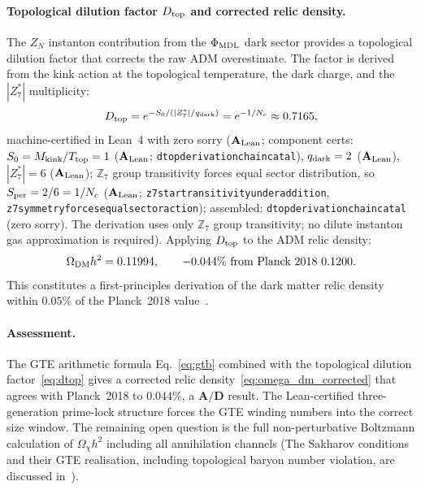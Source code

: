 \documentclass[11pt]{article}
\newcommand{\CatAL}{\ensuremath{\textbf{A}_{\rm Lean}}}
\newcommand{\CatAD}{\textbf{A/D}}
\newcommand{\lean}[1]{%
  \penalty-100
  \begingroup\def\_{\textunderscore\allowbreak}\texttt{#1}\endgroup}
\begin{document}
\paragraph{Topological dilution factor $D_{\rm top}$ and corrected relic density.}
The $Z_N$ instanton contribution from the $\Phi_{\rm MDL}$ dark sector provides
a topological dilution factor that corrects the raw ADM overestimate.
The factor is derived from the kink action at the topological temperature,
the dark charge, and the $|Z_7^*|$ multiplicity:
\begin{equation}
  D_{\rm top} = e^{-S_0/(|Z_7^*|/q_{\rm dark})} = e^{-1/N_c} \approx 0.7165,
  \label{eq:dtop}
\end{equation}
machine-certified in Lean~4 with zero sorry ($\CatAL$; component certs:
$S_0 = M_{\rm kink}/T_{\rm top} = 1$ (\CatAL; \lean{d\_top\_derivation\allowbreak\_chain\_catal}),
$q_{\rm dark} = 2$ (\CatAL), $|Z_7^*| = 6$ (\CatAL);
$\mathbb{Z}_7$ group transitivity forces equal sector distribution, so
$S_{\rm per} = 2/6 = 1/N_c$
(\CatAL; \lean{z7\_star\_transitivity\_under\_addition},
\lean{z7\_symmetry\_forces\_equal\_sector\_action});
assembled: \lean{d\_top\_derivation\_chain\_catal} (zero sorry).
The derivation uses only $\mathbb{Z}_7$ group transitivity;
no dilute instanton gas approximation is required).
Applying $D_{\rm top}$ to the ADM relic density:
\begin{equation}
  \Omega_{\rm DM}h^2 = 0.11994, \qquad -0.044\%\ \text{from Planck~2018}\ 0.1200.
  \label{eq:omega_dm_corrected}
\end{equation}
This constitutes a first-principles derivation of the dark matter relic density
within $0.05\%$ of the Planck~2018 value~\cite{Planck2018}.

\paragraph{Assessment.}
The GTE arithmetic formula Eq.~\eqref{eq:gtb} combined with the topological dilution
factor~\eqref{eq:dtop} gives a corrected relic density~\eqref{eq:omega_dm_corrected}
that agrees with Planck~2018 to $0.044\%$, a $\CatAD$ result.
The Lean-certified three-generation prime-lock structure forces the GTE winding numbers
into the correct size window. The remaining open question is the full non-perturbative
Boltzmann calculation of $\Omega_\chi h^2$ including all annihilation channels
(The Sakharov conditions~\cite{Sakharov1967} and their GTE realisation,
including topological baryon number violation, are discussed in~\cite{SpivackDeeperConsequences}).
\end{document}
